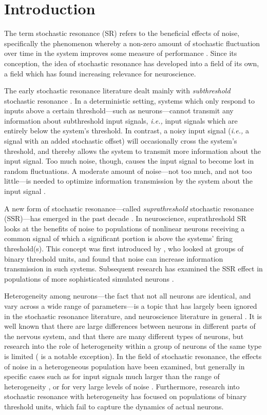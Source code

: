 \documentclass[12pt]{article}
\newcommand{\ie}{\emph{i.e., }}
\newcommand{\scnlabel}[1]{\label{scn:#1}}
\begin{document}
\section{Introduction}
\scnlabel{introduction}

The term stochastic resonance (SR) refers to the beneficial effects of noise, specifically the phenomenon whereby a non-zero amount of stochastic fluctuation over time in the system improves some measure of performance \citep{McDonnell2009}. Since its conception, the idea of stochastic resonance has developed into a field of its own, a field which has found increasing relevance for neuroscience.

The early stochastic resonance literature dealt mainly with \emph{subthreshold} stochastic resonance \citep{Gammaitoni1998}. In a deterministic setting, systems which only respond to inputs above a certain threshold---such as neurons---cannot transmit any information about subthreshold input signals, \ie input signals which are entirely below the system's threshold. In contrast, a noisy input signal (\ie a signal with an added stochastic offset) will occasionally cross the system's threshold, and thereby allows the system to transmit more information about the input signal. Too much noise, though, causes the input signal to become lost in random fluctuations. A moderate amount of noise---not too much, and not too little---is needed to optimize information transmission by the system about the input signal \citep{Wiesenfeld1994,Longtin1998}.

A new form of stochastic resonance---called \emph{suprathreshold} stochastic resonance (SSR)---has emerged in the past decade \citep{McDonnell2009}. In neuroscience, suprathreshold SR looks at the benefits of noise to populations of nonlinear neurons receiving a common signal of which a significant portion is above the systems' firing threshold(s). This concept was first introduced by \cite{Stocks2000}, who looked at groups of binary threshold units, and found that noise can increase information transmission in such systems. Subsequent research has examined the SSR effect in populations of more sophisticated simulated neurons \citep{Stocks2001}.

Heterogeneity among neurons---the fact that not all neurons are identical, and vary across a wide range of parameters---is a topic that has largely been ignored in the stochastic resonance literature, and neuroscience literature in general \citep{Machens2010}. It is well known that there are large differences between neurons in different parts of the nervous system, and that there are many different types of neurons, but research into the role of heterogeneity within a group of neurons of the same type is limited (\cite{Eliasmith2003} is a notable exception). In the field of stochastic resonance, the effects of noise in a heterogeneous population have been examined, but generally in specific cases such as for input signals much larger than the range of heterogeneity \citep{Stocks2000}, or for very large levels of noise \citep{McDonnell2006}. Furthermore, research into stochastic resonance with heterogeneity has focused on populations of binary threshold units, which fail to capture the dynamics of actual neurons.
\end{document}
